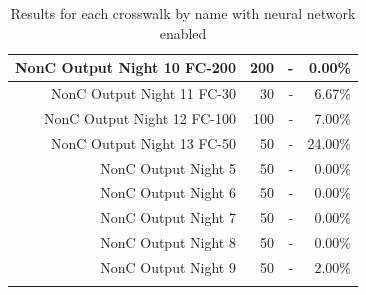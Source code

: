 \documentclass[12pt]{ucthesis}
\begin{document}
\begin{center}
\begin{longtable}{| r | r | r | r |}
    \hline
    NonC Output Night 10 FC-200 & 200 & -  & 0.00\% \bigstrut\\
    \hline
    NonC Output Night 11 FC-30 & 30 & -  & 6.67\% \bigstrut\\
    \hline
    NonC Output Night 12 FC-100 & 100 & -  & 7.00\% \bigstrut\\
    \hline
    NonC Output Night 13 FC-50 & 50 & -  & 24.00\% \bigstrut\\
    \hline
    NonC Output Night 5 & 50 & -  & 0.00\% \bigstrut\\
    \hline
    NonC Output Night 6 & 50 & -  & 0.00\% \bigstrut\\
    \hline
    NonC Output Night 7 & 50 & -  & 0.00\% \bigstrut\\
    \hline
    NonC Output Night 8 & 50 & -  & 0.00\% \bigstrut\\
    \hline
    NonC Output Night 9 & 50 & -  & 2.00\% \bigstrut\\
    \hline

    \caption{Results for each crosswalk by name with neural network enabled}
    \label{tab:appendixcrosswalkresults} 
    \end{longtable}
\end{center}
\end{document}
